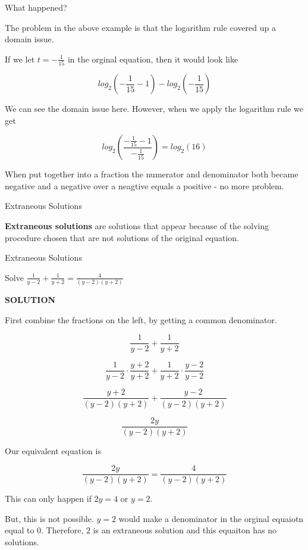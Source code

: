 \documentclass{ximera}
\begin{document}
What happened?


The problem in the above example is that the logarithm rule covered up a domain issue.

If we let $t = -\frac{1}{15}$ in the orginal equation, then it would look like 


\[    log_2\left(-\frac{1}{15}-1\right) - log_2\left(-\frac{1}{15}\right)   \]

We can see the domain issue here.  However, when we apply the logarithm rule we get



\[   log_2\left(\frac{-\frac{1}{15}-1}{-\frac{1}{15}}\right)    = log_2(16)  \]


When put together into a fraction the numerator and denominator both became negative and a negative over a neagtive equals a positive - no more problem.





\begin{definition} Extraneous Solutions

\textbf{Extraneous solutions} are solutions that appear because of the solving procedure chosen that are not solutions of the original equation.

\end{definition}








\begin{example} Extraneous Solutions


Solve $\frac{1}{y-2} + \frac{1}{y+2} = \frac{4}{(y-2)(y+2)}$


\textbf{\textcolor{purple!50!blue!90!black}{SOLUTION}}



First combine the fractions on the left, by getting a common denominator.



\[    \frac{1}{y-2} + \frac{1}{y+2}        \]

\[    \frac{1}{y-2} \cdot \frac{y+2}{y+2} + \frac{1}{y+2}  \cdot \frac{y-2}{y-2}       \]

\[    \frac{y+2}{(y-2)(y+2)} + \frac{y-2}{(y-2)(y+2)}      \]

\[    \frac{2y}{(y-2)(y+2)}     \]

Our equivalent equation is


\[    \frac{2y}{(y-2)(y+2)}   = \frac{4}{(y-2)(y+2)}   \]


This can only happen if $2y = 4$ or $y = 2$.

But, this is not possible.  $y=2$ would make a denominator in the orginal equaiotn equal to $0$.  Therefore, $2$ is an extraneous solution and this equaiton has no solutions.


\end{example}
\end{document}
